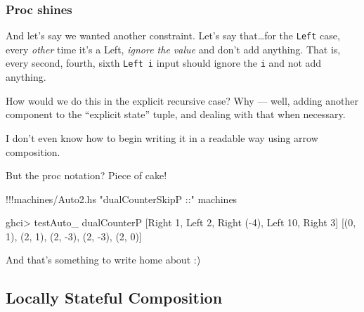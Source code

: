 \documentclass[]{article}
\newenvironment{Shaded}{}{}
\newcommand{\DataTypeTok}[1]{\textcolor[rgb]{0.56,0.13,0.00}{{#1}}}
\newcommand{\DecValTok}[1]{\textcolor[rgb]{0.25,0.63,0.44}{{#1}}}
\newcommand{\StringTok}[1]{\textcolor[rgb]{0.25,0.44,0.63}{{#1}}}
\newcommand{\FunctionTok}[1]{\textcolor[rgb]{0.02,0.16,0.49}{{#1}}}
\newcommand{\NormalTok}[1]{{#1}}
\begin{document}
\subsubsection{Proc shines}\label{proc-shines}

And let's say we wanted another constraint. Let's say that\ldots{}for
the \texttt{Left} case, every \emph{other} time it's a Left,
\emph{ignore the value} and don't add anything. That is, every second,
fourth, sixth \texttt{Left\ i} input should ignore the \texttt{i} and
not add anything.

How would we do this in the explicit recursive case? Why --- well,
adding another component to the ``explicit state'' tuple, and dealing
with that when necessary.

I don't even know how to begin writing it in a readable way using arrow
composition.

But the proc notation? Piece of cake!

\begin{Shaded}
\begin{Highlighting}[]
\FunctionTok{!!!}\NormalTok{machines}\FunctionTok{/}\NormalTok{Auto2.hs }\StringTok{"dualCounterSkipP ::"} \NormalTok{machines}
\end{Highlighting}
\end{Shaded}

\begin{Shaded}
\begin{Highlighting}[]
\NormalTok{ghci}\FunctionTok{>} \NormalTok{testAuto_ dualCounterP [}\DataTypeTok{Right} \DecValTok{1}\NormalTok{, }\DataTypeTok{Left} \DecValTok{2}\NormalTok{, }\DataTypeTok{Right} \NormalTok{(}\FunctionTok{-}\DecValTok{4}\NormalTok{), }\DataTypeTok{Left} \DecValTok{10}\NormalTok{, }\DataTypeTok{Right} \DecValTok{3}\NormalTok{]}
\NormalTok{[(}\DecValTok{0}\NormalTok{, }\DecValTok{1}\NormalTok{), (}\DecValTok{2}\NormalTok{, }\DecValTok{1}\NormalTok{), (}\DecValTok{2}\NormalTok{, }\FunctionTok{-}\DecValTok{3}\NormalTok{), (}\DecValTok{2}\NormalTok{, }\FunctionTok{-}\DecValTok{3}\NormalTok{), (}\DecValTok{2}\NormalTok{, }\DecValTok{0}\NormalTok{)]}
\end{Highlighting}
\end{Shaded}

And that's something to write home about :)

\subsection{Locally Stateful
Composition}\label{locally-stateful-composition}
\end{document}
